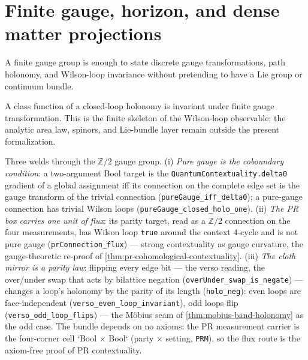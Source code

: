 \section{Finite gauge, horizon, and dense matter projections}

\begin{proposition}\label{thm:finite-gauge-group}\leanok{}
A finite gauge group is enough to state discrete gauge transformations, path
holonomy, and Wilson-loop invariance without pretending to have a Lie group or
continuum bundle.
\end{proposition}

\begin{theorem}\label{thm:wilson-loop-invariant}\leanok{}
A class function of a closed-loop holonomy is invariant under finite gauge
transformation.  This is the finite skeleton of the Wilson-loop observable; the
analytic area law, spinors, and Lie-bundle layer remain outside the present
formalization.
\end{theorem}

\begin{theorem}\label{thm:z2-flux-reading}\leanok{}
Three welds through the $\mathbb{Z}/2$ gauge group. (i) \emph{Pure gauge is the
coboundary condition}: a two-argument Bool target is the
\texttt{QuantumContextuality.delta0} gradient of a global assignment iff its
connection on the complete edge set is the gauge transform of the trivial
connection (\texttt{pureGauge\_iff\_delta0}); a pure-gauge connection has trivial
Wilson loops (\texttt{pureGauge\_closed\_holo\_one}). (ii) \emph{The PR box
carries one unit of flux}: its parity target, read as a $\mathbb{Z}/2$ connection
on the four measurements, has Wilson loop \texttt{true} around the context
4-cycle and is not pure gauge (\texttt{prConnection\_flux}) --- strong
contextuality as gauge curvature, the gauge-theoretic re-proof of
\cref{thm:pr-cohomological-contextuality}. (iii) \emph{The cloth mirror is a
parity law}: flipping every edge bit --- the verso reading, the over/under swap
that acts by bilattice negation (\texttt{overUnder\_swap\_is\_negate}) ---
changes a loop's holonomy by the parity of its length
(\texttt{holo\_neg}): even loops are face-independent
(\texttt{verso\_even\_loop\_invariant}), odd loops flip
(\texttt{verso\_odd\_loop\_flips}) --- the M\"obius seam of
\cref{thm:mobius-band-holonomy} as the odd case. The bundle depends on no
axioms: the PR measurement carrier is the four-corner cell
`Bool × Bool` (party × setting, \texttt{PRM}), so the flux route is the
axiom-free proof of PR contextuality.
\end{theorem}

